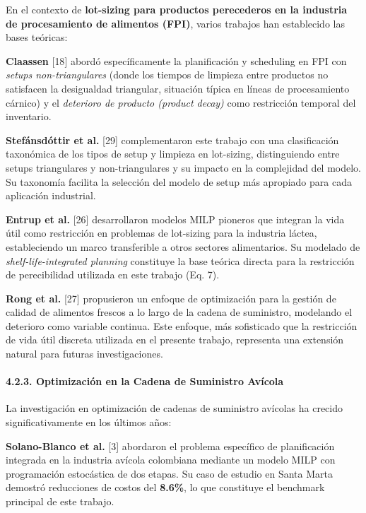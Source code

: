 \documentclass[
  spanish,
  12pt,
]{article}
\begin{document}
En el contexto de \textbf{lot-sizing para productos perecederos en la
industria de procesamiento de alimentos (FPI)}, varios trabajos han
establecido las bases teóricas:

\textbf{Claassen} {[}18{]} abordó específicamente la planificación y
scheduling en FPI con \emph{setups non-triangulares} (donde los tiempos
de limpieza entre productos no satisfacen la desigualdad triangular,
situación típica en líneas de procesamiento cárnico) y el
\emph{deterioro de producto (product decay)} como restricción temporal
del inventario.

\textbf{Stefánsdóttir et al.} {[}29{]} complementaron este trabajo con
una clasificación taxonómica de los tipos de setup y limpieza en
lot-sizing, distinguiendo entre setups triangulares y non-triangulares y
su impacto en la complejidad del modelo. Su taxonomía facilita la
selección del modelo de setup más apropiado para cada aplicación
industrial.

\textbf{Entrup et al.} {[}26{]} desarrollaron modelos MILP pioneros que
integran la vida útil como restricción en problemas de lot-sizing para
la industria láctea, estableciendo un marco transferible a otros
sectores alimentarios. Su modelado de \emph{shelf-life-integrated
planning} constituye la base teórica directa para la restricción de
perecibilidad utilizada en este trabajo (Eq. 7).

\textbf{Rong et al.} {[}27{]} propusieron un enfoque de optimización
para la gestión de calidad de alimentos frescos a lo largo de la cadena
de suministro, modelando el deterioro como variable continua. Este
enfoque, más sofisticado que la restricción de vida útil discreta
utilizada en el presente trabajo, representa una extensión natural para
futuras investigaciones.

\paragraph{4.2.3. Optimización en la Cadena de Suministro
Avícola}\label{optimizaciuxf3n-en-la-cadena-de-suministro-avuxedcola}

La investigación en optimización de cadenas de suministro avícolas ha
crecido significativamente en los últimos años:

\textbf{Solano-Blanco et al.} {[}3{]} abordaron el problema específico
de planificación integrada en la industria avícola colombiana mediante
un modelo MILP con programación estocástica de dos etapas. Su caso de
estudio en Santa Marta demostró reducciones de costos del
\textbf{8.6\%}, lo que constituye el benchmark principal de este
trabajo.
\end{document}
